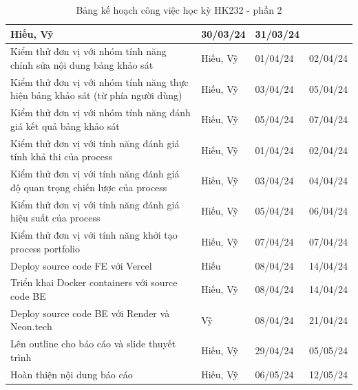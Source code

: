 \begin{table}[H]
{\begin{tabular}{|p{11cm}|p{1.75cm}|p{1.5cm}|p{1.5cm}|}
        { Hiếu, Vỹ} &
        { 30/03/24} &
        { 31/03/24} \\ \hline
        { Kiểm thử đơn vị với nhóm tính năng chỉnh sửa nội dung bảng khảo sát} &
        { Hiếu, Vỹ} &
        { 01/04/24} &
        { 02/04/24} \\ \hline
        { Kiểm thử đơn vị với nhóm tính năng thực hiện bảng khảo sát (từ phía người dùng)} &
        { Hiếu, Vỹ} &
        { 03/04/24} &
        { 05/04/24} \\ \hline
        { Kiểm thử đơn vị với nhóm tính năng đánh giá kết quả bảng khảo sát} &
        { Hiếu, Vỹ} &
        { 05/04/24} &
        { 07/04/24} \\ \hline
        { Kiểm thử đơn vị với tính năng đánh giá tính khả thi của process} &
        { Hiếu, Vỹ} &
        { 01/04/24} &
        { 02/04/24} \\ \hline
        { Kiểm thử đơn vị với tính năng đánh giá độ quan trọng chiến lược của process} &
        { Hiếu, Vỹ} &
        { 03/04/24} &
        { 04/04/24} \\ \hline
        { Kiểm thử đơn vị với tính năng đánh giá hiệu suất của process} &
        { Hiếu, Vỹ} &
        { 05/04/24} &
        { 06/04/24} \\ \hline
        { Kiểm thử đơn vị với tính năng khởi tạo process portfolio} &
        { Hiếu, Vỹ} &
        { 07/04/24} &
        { 07/04/24} \\ \hline
        { Deploy source code FE với Vercel} &
        { Hiếu} &
        { 08/04/24} &
        { 14/04/24} \\ \hline
        { Triển khai Docker containers với source code BE} &
        { Hiếu, Vỹ} &
        { 08/04/24} &
        { 14/04/24} \\ \hline
        { Deploy source code BE với Render và Neon.tech} &
        { Vỹ} &
        { 08/04/24} &
        { 21/04/24} \\ \hline
        { Lên outline cho báo cáo và slide thuyết trình} &
        { Hiếu, Vỹ} &
        { 29/04/24} &
        { 05/05/24} \\ \hline
        { Hoàn thiện nội dung báo cáo} &
        { Hiếu, Vỹ} &
        { 06/05/24} &
        { 12/05/24} \\ \hline 
    \end{tabular}%
    }
    \caption{Bảng kế hoạch công việc học kỳ HK232 - phần 2}
\end{table}

